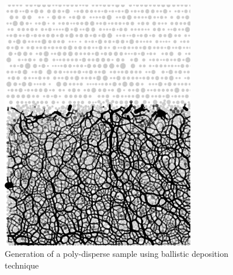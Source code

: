 \begin{figure}
	\centering
	\includegraphics[width=0.75\textwidth]{ini_sample}
	\caption{Generation of a poly-disperse sample using ballistic deposition 
	technique}
	\label{fig:ini_sample}
\end{figure}
%

